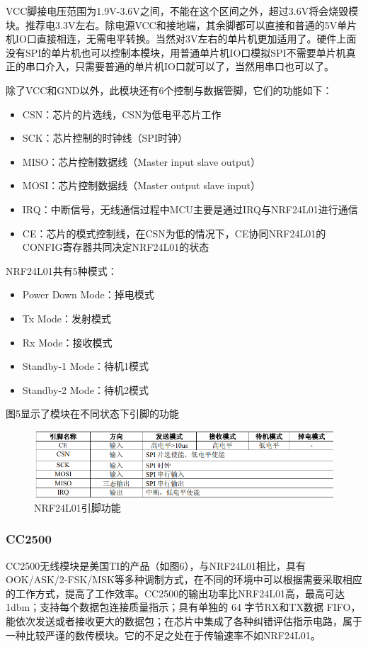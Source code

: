 \documentclass[UTF8,a4paper,11pt]{article}
\begin{document}
VCC脚接电压范围为1.9V-3.6V之间，不能在这个区间之外，超过3.6V将会烧毁模块。推荐电3.3V左右。除电源VCC和接地端，其余脚都可以直接和普通的5V单片机IO口直接相连，无需电平转换。当然对3V左右的单片机更加适用了。硬件上面没有SPI的单片机也可以控制本模块，用普通单片机IO口模拟SPI不需要单片机真正的串口介入，只需要普通的单片机IO口就可以了，当然用串口也可以了。

除了VCC和GND以外，此模块还有6个控制与数据管脚，它们的功能如下：
\begin{itemize}
\item CSN：芯片的片选线，CSN为低电平芯片工作
\item SCK：芯片控制的时钟线（SPI时钟）
\item MISO：芯片控制数据线（Master input slave output）
\item MOSI：芯片控制数据线（Master output slave input）
\item IRQ：中断信号，无线通信过程中MCU主要是通过IRQ与NRF24L01进行通信
\item CE：芯片的模式控制线，在CSN为低的情况下，CE协同NRF24L01的CONFIG寄存器共同决定NRF24L01的状态
\end{itemize}

NRF24L01共有5种模式：
\begin{itemize}
\item Power Down Mode：掉电模式
\item Tx Mode：发射模式
\item Rx Mode：接收模式
\item Standby-1 Mode：待机1模式
\item Standby-2 Mode：待机2模式
\end{itemize}

图5显示了模块在不同状态下引脚的功能

\begin{figure}[htbp]
    \centering
    \includegraphics[scale=0.8]{p4.png}
    \caption{NRF24L01引脚功能}
\end{figure} 

\subsubsection{CC2500}
CC2500无线模块是美国TI的产品（如图6），与NRF24L01相比，具有OOK/ASK/2-FSK/MSK等多种调制方式，在不同的环境中可以根据需要采取相应的工作方式，提高了工作效率。CC2500的输出功率比NRF24L01高，最高可达1dbm；支持每个数据包连接质量指示；具有单独的 64 字节RX和TX数据 FIFO，能依次发送或者接收更大的数据包；在芯片中集成了各种纠错评估指示电路，属于一种比较严谨的数传模块。它的不足之处在于传输速率不如NRF24L01。
\end{document}
